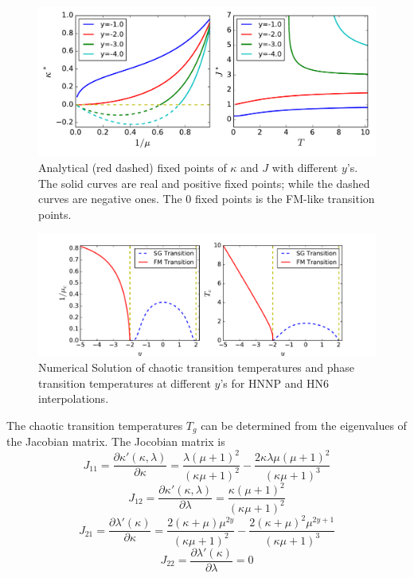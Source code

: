 \begin{figure}
\centering \includegraphics[width=1.0\columnwidth]{Chapter-3/HP_KJvsTys_FMTrans.pdf}
\protect\caption{Analytical (red dashed) fixed points of $\kappa$ and $J$ with different $y$'s. The solid curves are real and positive fixed points; while the dashed curves are negative ones. The 0 fixed points is the FM-like transition points.}
\label{fig:afm-hp6KJnegy} 
\end{figure}

\begin{figure}
\centering \includegraphics[width=1.0\columnwidth]{Chapter-3/HN6_TransTvsY1.pdf}
\protect\caption{Numerical Solution of chaotic transition temperatures and phase transition temperatures at different $y$'s for HNNP and HN6 interpolations. }
\label{fig:afm-hp6Tys} 
\end{figure}

The chaotic transition temperatures $T_g$ can be determined from the eigenvalues of the Jacobian matrix.
The Jocobian matrix is
\begin{equation}
J_{11} = \frac{\partial \kappa'(\kappa, \lambda)}{\partial \kappa}=\frac{\lambda  (\mu +1)^2}{(\kappa  \mu +1)^2}-\frac{2 \kappa  \lambda  \mu  (\mu +1)^2}{(\kappa  \mu +1)^3}
\end{equation}
\begin{equation}
J_{12} = \frac{\partial \kappa'(\kappa, \lambda)}{\partial \lambda}=\frac{\kappa  (\mu +1)^2}{(\kappa  \mu +1)^2}
\end{equation}
\begin{equation}
J_{21} = \frac{\partial \lambda'(\kappa)}{\partial \kappa}=\frac{2 (\kappa +\mu ) \mu ^{2 y}}{(\kappa  \mu +1)^2}-\frac{2 (\kappa +\mu )^2 \mu ^{2 y+1}}{(\kappa  \mu +1)^3}
\end{equation}
\begin{equation}
J_{22} = \frac{\partial \lambda'(\kappa)}{\partial \lambda}=0
\end{equation}

